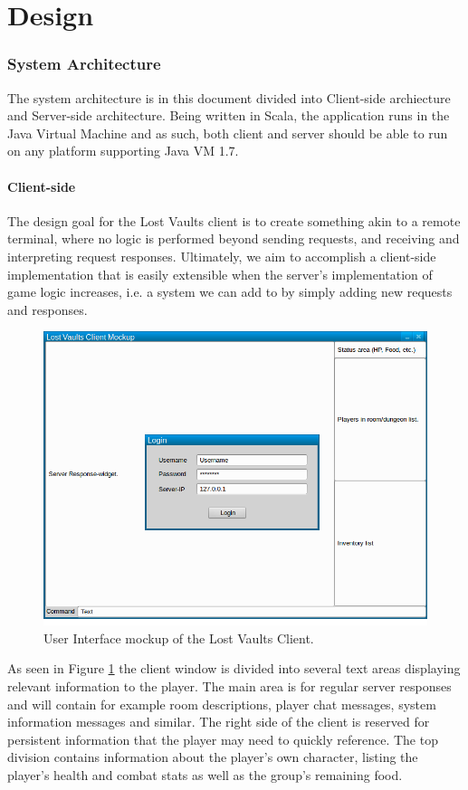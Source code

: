 \documentclass[a4paper]{article}
\begin{document}
\part{Design}
\section{System Architecture}
The system architecture is in this document divided into  Client-side archiecture and Server-side architecture. Being written in Scala, the application runs in the Java Virtual Machine and as such, both client and server should be able to run on any platform supporting Java VM 1.7.
\subsection{Client-side}
The design goal for the Lost Vaults client is to create something akin to a remote terminal, where no logic is performed beyond sending requests, and receiving and interpreting request responses. Ultimately, we aim to accomplish a client-side implementation that is easily extensible when the server's implementation of game logic increases, i.e. a system we can add to by simply adding new requests and responses.
\begin{figure}[hbt]
\centering
\includegraphics[width=1.0\textwidth]{clientmockup}
\caption{\label{fig:Client}User Interface mockup of the Lost Vaults Client.}
\end{figure}
As seen in Figure \ref{fig:Client} the client window is divided into several text areas displaying relevant information to the player. The main area is for regular server responses and will contain for example room descriptions, player chat messages, system information messages and similar.
The right side of the client is reserved for persistent information that the player may need to quickly reference. The top division contains information about the player's own character, listing the player's health and combat stats as well as the group's remaining food.
\end{document}
